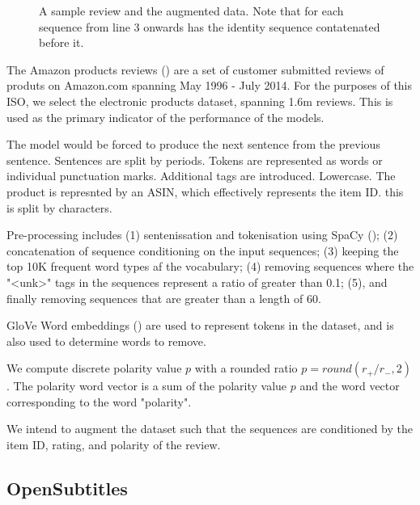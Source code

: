 \documentclass[12pt,twoside]{report}
\begin{document}
\begin{figure}[!ht]
	\centering
	
	
	\caption{A sample review and the augmented data. Note that for each sequence from line 3 onwards has the identity sequence contatenated before it. \label{aug_1}}
	\end{figure}

The Amazon products reviews (\cite{he_ups_2016}) are a set of customer submitted reviews of produts on Amazon.com spanning May 1996 - July 2014. For the purposes of this ISO, we select the electronic products dataset, spanning 1.6m reviews. This is used as the primary indicator of the performance of the models.

The model would be forced to produce the next sentence from the previous sentence. Sentences are split by periods. Tokens are represented as words or individual punctuation marks. Additional tags are introduced. Lowercase. The product is represnted by an ASIN, which effectively represents the item ID. this is split by characters.


Pre-processing includes (1) sentenissation and tokenisation using SpaCy (\cite{honnibal_spacy_2017}); (2) concatenation of sequence conditioning on the input sequences; (3) keeping the top 10K frequent word types af the vocabulary; (4) removing sequences where the "<unk>" tags in the sequences represent a ratio of greater than 0.1; (5), and finally removing sequences that are greater than a length of 60. 


GloVe Word embeddings (\cite{pennington_glove:_2014}) are used to represent tokens in the dataset, and is also used to determine words to remove. 

We compute discrete polarity value $p$ with a rounded ratio $p=round(r_{+}/r_{-},2)$. The polarity word vector is a sum of the polarity value $p$ and the word vector corresponding to the word "polarity".


We intend to augment the dataset such that the sequences are conditioned by the item ID, rating, and polarity of the review.


\subsection{OpenSubtitles}
\end{document}
